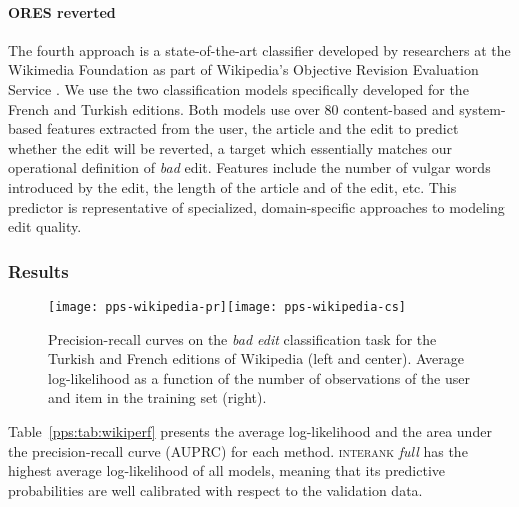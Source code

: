 \paragraph{ORES reverted}
The fourth approach is a state-of-the-art classifier developed by researchers at the Wikimedia Foundation as part of Wikipedia's Objective Revision Evaluation Service \citep{wikimedia2015artificial}.
We use the two classification models specifically developed for the French and Turkish editions.
Both models use over \num{80} content-based and system-based features extracted from the user, the article and the edit to predict whether the edit will be reverted, a target which essentially matches our operational definition of \emph{bad} edit.
Features include the number of vulgar words introduced by the edit, the length of the article and of the edit, etc.
This predictor is representative of specialized, domain-specific approaches to modeling edit quality.

\subsubsection{Results}

\begin{figure*}
	\texttt{[image: pps-wikipedia-pr]}\hfill\texttt{[image: pps-wikipedia-cs]}
	\caption{Precision-recall curves on the \emph{bad edit} classification task for the Turkish and French editions of Wikipedia (left and center).
		Average log-likelihood as a function of the number of observations of the user and item in the training set (right).}
	\label{pps:fig:wikipr}
\end{figure*}

Table~\ref{pps:tab:wikiperf} presents the average log-likelihood and the area under the precision-recall curve (AUPRC) for each method.
\textsc{interank} \emph{full} has the highest average log-likelihood of all models, meaning that its predictive probabilities are well calibrated with respect to the validation data.

